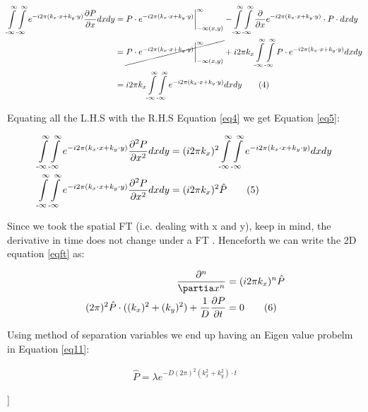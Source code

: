 \begin{@twocolumnfalse}
\begin{align}  
\int\limits^{\infty}_{\text{-}\infty}\int\limits^{\infty}_{\text{-}\infty} e^{-i 2\pi (k_x \cdot x + k_y \cdot y )} \frac{\partial P}{\partial x} dx dy &= P \cdot e^{-i 2\pi (k_x \cdot x + k_y \cdot y )} \bigg \vert^{\infty}_{-\infty(x,y)} - \int\limits^{\infty}_{\text{-}\infty}\int\limits^{\infty}_{\text{-}\infty} \frac{\partial }{\partial x} e^{-i 2\pi (k_x \cdot x + k_y \cdot y )} \cdot P \cdot dx dy\\
& = \cancel{P \cdot e^{-i 2\pi (k_x \cdot x + k_y \cdot y )} \bigg \vert^{\infty}_{-\infty(x,y)}} + i 2\pi k_x \int\limits^{\infty}_{\text{-}\infty}\int\limits^{\infty}_{\text{-}\infty} P \cdot e^{-i 2\pi (k_x \cdot x + k_y \cdot y )} dx dy\\
& = i 2\pi k_x \int\limits^{\infty}_{\text{-}\infty}\int\limits^{\infty}_{\text{-}\infty} e^{-i 2\pi (k_x \cdot x + k_y \cdot y )} dx dy \tag{4}
\label{eq4}  
\end{align} 

Equating all the L.H.S with the R.H.S Equation \eqref{eq4} we get Equation \eqref{eq5}: 

\begin{align}  
\int\limits^{\infty}_{\text{-}\infty}\int\limits^{\infty}_{\text{-}\infty} e^{-i 2\pi (k_x \cdot x + k_y \cdot y )} \frac{\partial^2 P}{\partial x^2} dx dy &= (i 2\pi k_x)^2 \int\limits^{\infty}_{\text{-}\infty}\int\limits^{\infty}_{\text{-}\infty} e^{-i 2\pi (k_x \cdot x + k_y \cdot y )} dx dy \\
\int\limits^{\infty}_{\text{-}\infty}\int\limits^{\infty}_{\text{-}\infty} e^{-i 2\pi (k_x \cdot x + k_y \cdot y )} \frac{\partial^2 P}{\partial x^2} dx dy &= (i 2\pi k_x)^2 \hat{P} \tag{5}
\label{eq5}  
\end{align} 

Since we took the spatial FT (i.e. dealing with x and y), keep in mind, the derivative in time does not change under a FT \cite{TANG2022186}. Henceforth we can write the 2D equation \eqref{eqft} as: 

    \begin{align*}
    \frac{\partial^n}{\partia x^n} &= (i 2\pi k_x)^n \hat{P} \\
    (2\pi)^2 \hat{P} \cdot ((k_x)^2 + (k_y)^2)  + \frac{1}{D} \frac{\partial P}{ \partial t} &= 0 \tag{6} \\
        \label{eqft}  
    \end{align*}    

Using method of separation variables we end up having an Eigen value probelm in Equation \eqref{eq11}:

\begin{align*}
    \hat{P} =\lambda e^{-D (2\pi)^2 (k_x^2 + k_y^2) \cdot t} \tag{7}
    \label{eq11}  
\end{align*}

\end{@twocolumnfalse}]

